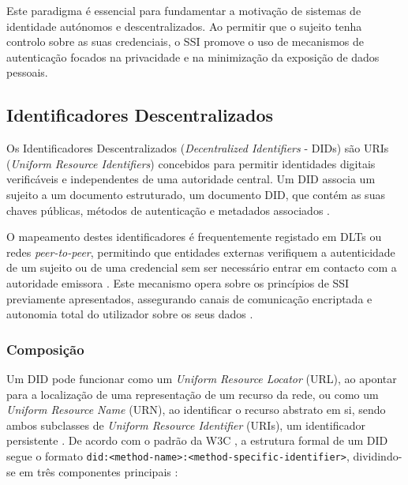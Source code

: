 Este paradigma é essencial para fundamentar a motivação de sistemas de identidade autónomos e descentralizados. Ao permitir que o sujeito tenha controlo sobre as suas credenciais, o SSI promove o uso de mecanismos de autenticação focados na privacidade e na minimização da exposição de dados pessoais.

\subsection{Identificadores Descentralizados}

Os Identificadores Descentralizados (\textit{Decentralized Identifiers} - DIDs) são URIs (\textit{Uniform Resource Identifiers}) concebidos para permitir identidades digitais verificáveis e independentes de uma autoridade central. Um DID associa um sujeito a um documento estruturado, um documento DID, que contém as suas chaves públicas, métodos de autenticação e metadados associados \cite{ssimeetup_did_report}.

O mapeamento destes identificadores é frequentemente registado em DLTs ou redes \textit{peer-to-peer}, permitindo que entidades externas verifiquem a autenticidade de um sujeito ou de uma credencial sem ser necessário entrar em contacto com a autoridade emissora \cite{mazzocca2025survey}. Este mecanismo opera sobre os princípios de SSI previamente apresentados, assegurando canais de comunicação encriptada e autonomia total do utilizador sobre os seus dados \cite{sedlmeir2021digital}.

\subsubsection{Composição}

Um DID pode funcionar como um \textit{Uniform Resource Locator} (URL), ao apontar para a localização de uma representação de um recurso da rede, ou como um \textit{Uniform Resource Name} (URN), ao identificar o recurso abstrato em si, sendo ambos subclasses de \textit{Uniform Resource Identifier} (URIs), um identificador persistente \cite{preukschat2021self}. De acordo com o padrão da W3C \cite{ssimeetup_did_report}, a estrutura formal de um DID segue o formato \texttt{did:<method-name>:<method-specific-identifier>}, dividindo-se em três componentes principais \cite{w3c_did_spec}:

